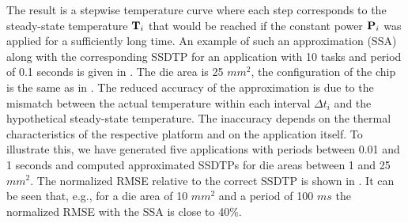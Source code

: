 The result is a stepwise temperature curve where each step corresponds to the steady-state temperature $\mathbf{T}_i$ that would be reached if the constant power $\mathbf{P}_i$ was applied for a sufficiently long time. An example of such an approximation (SSA) along with the corresponding SSDTP for an application with 10 tasks and period of 0.1 seconds is given in . The die area is 25 $mm^2$, the configuration of the chip is the same as in . The reduced accuracy of the approximation is due to the mismatch between the actual temperature within each interval $\Delta t_i$ and the hypothetical steady-state temperature. The inaccuracy depends on the thermal characteristics of the respective platform and on the application itself. To illustrate this, we have generated five applications with periods between 0.01 and 1 seconds and computed approximated SSDTPs for die areas between 1 and 25 $mm^2$. The normalized RMSE relative to the correct SSDTP is shown in . It can be seen that, e.g., for a die area of 10 $mm^2$ and a period of 100 $ms$ the normalized RMSE with the SSA is close to 40\%.
